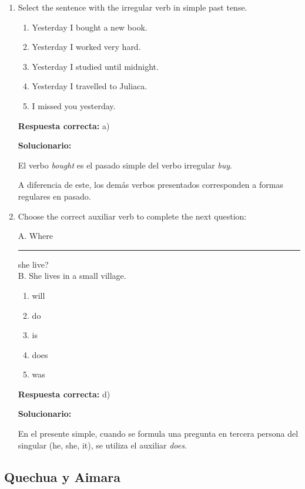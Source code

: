 \begin{enumerate}[resume]

	
	\item Select the sentence with the irregular verb in simple past tense.
	\begin{enumerate}[label=\alph*)]
		\item Yesterday I bought a new book.
		\item Yesterday I worked very hard.
		\item Yesterday I studied until midnight.
		\item Yesterday I travelled to Juliaca.
		\item I missed you yesterday.
	\end{enumerate}
	\textbf{Respuesta correcta:} a)
	
	\vspace{2mm}
	\textbf{Solucionario:}
	
	El verbo \textit{bought} es el pasado simple del verbo irregular \textit{buy}.
	
	A diferencia de este, los demás verbos presentados corresponden a formas regulares en pasado.
	
	

	
	\vspace{6mm}
	
	\item Choose the correct auxiliar verb to complete the next question:
	
	A. Where \rule{1.5cm}{0.15mm} she live?\\
	B. She lives in a small village.
	\begin{enumerate}[label=\alph*)]
		\item will
		\item do
		\item is
		\item does
		\item was
	\end{enumerate}
	\textbf{Respuesta correcta:} d)
	
	\vspace{2mm}
	\textbf{Solucionario:}
	
	En el presente simple, cuando se formula una pregunta en tercera persona del singular (he, she, it), se utiliza el auxiliar \textit{does}.
	

	
	\vspace{6mm}
\end{enumerate}

\subsection*{Quechua y Aimara}

